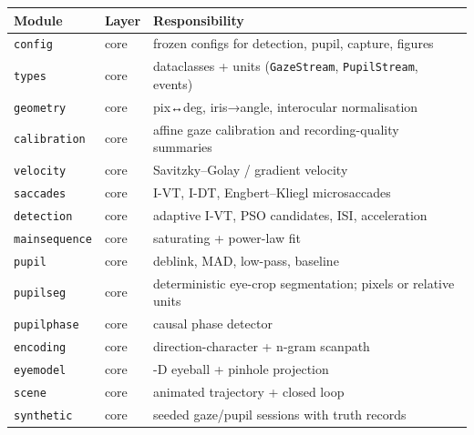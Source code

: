 \documentclass[
]{article}
\newcounter{none} %
\begin{document}
{\def\LTcaptype{none} %
\begin{longtable}[]{@{}
  >{\raggedright\arraybackslash}p{}
  >{\raggedright\arraybackslash}p{}
  >{\raggedright\arraybackslash}p{}@{}}
\toprule\noalign{}
\begin{minipage}[b]{\linewidth}\raggedright
Module
\end{minipage} & \begin{minipage}[b]{\linewidth}\raggedright
Layer
\end{minipage} & \begin{minipage}[b]{\linewidth}\raggedright
Responsibility
\end{minipage} \\
\midrule\noalign{}
\endhead
\bottomrule\noalign{}
\endlastfoot
\texttt{config} & core & frozen configs for detection, pupil, capture,
figures \\
\texttt{types} & core & dataclasses + units (\texttt{GazeStream},
\texttt{PupilStream}, events) \\
\texttt{geometry} & core & pix↔deg, iris→angle, interocular
normalisation \\
\texttt{calibration} & core & affine gaze calibration and
recording-quality summaries \\
\texttt{velocity} & core & Savitzky--Golay / gradient velocity \\
\texttt{saccades} & core & I-VT, I-DT, Engbert--Kliegl microsaccades \\
\texttt{detection} & core & adaptive I-VT, PSO candidates, ISI,
acceleration \\
\texttt{mainsequence} & core & saturating + power-law fit \\
\texttt{pupil} & core & deblink, MAD, low-pass, baseline \\
\texttt{pupilseg} & core & deterministic eye-crop segmentation; pixels
or relative units \\
\texttt{pupilphase} & core & causal phase detector \\
\texttt{encoding} & core & direction-character + n-gram scanpath \\
\texttt{eyemodel} & core & 3-D eyeball + pinhole projection \\
\texttt{scene} & core & animated trajectory + closed loop \\
\texttt{synthetic} & core & seeded gaze/pupil sessions with truth
records \\

\end{longtable}}
\end{document}
